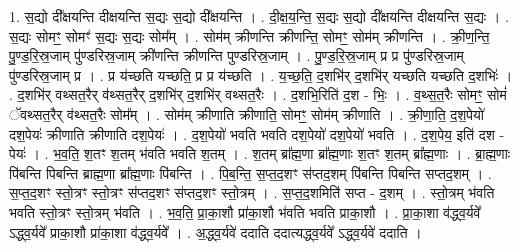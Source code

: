 \documentclass[17pt]{extarticle}
\begin{document}
1. स॒द्यो दी᳚क्षयन्ति दीक्षयन्ति स॒द्यः स॒द्यो दी᳚क्षयन्ति । . दी॒क्ष॒य॒न्ति॒ स॒द्यः स॒द्यो दी᳚क्षयन्ति दीक्षयन्ति स॒द्यः । . स॒द्यः सोमꣳ॒॒ सोमꣳ॑ स॒द्यः स॒द्यः सोम᳚म् । . सोम॑म् क्रीणन्ति क्रीणन्ति॒ सोमꣳ॒॒ सोम॑म् क्रीणन्ति । . क्री॒ण॒न्ति॒ पु॒ण्ड॒रि॒स्र॒जाम् पु॑ण्डरिस्र॒जाम् क्री॑णन्ति क्रीणन्ति पुण्डरिस्र॒जाम् । . पु॒ण्ड॒रि॒स्र॒जाम् प्र प्र पु॑ण्डरिस्र॒जाम् पु॑ण्डरिस्र॒जाम् प्र । . प्र य॑च्छति यच्छति॒ प्र प्र य॑च्छति । . य॒च्छ॒ति॒ द॒शभि॑र् द॒शभि॑र् यच्छति यच्छति द॒शभिः॑ । . द॒शभि॑र् वथ्सत॒रैर् व॑थ्सत॒रैर् द॒शभि॑र् द॒शभि॑र् वथ्सत॒रैः । . द॒शभि॒रिति॑ द॒श - भिः॒ । . व॒थ्स॒त॒रैः सोमꣳ॒॒ सोमं॑ ॅवथ्सत॒रैर् व॑थ्सत॒रैः सोम᳚म् । . सोम॑म् क्रीणाति क्रीणाति॒ सोमꣳ॒॒ सोम॑म् क्रीणाति । . क्री॒णा॒ति॒ द॒श॒पेयो॑ दश॒पेयः॑ क्रीणाति क्रीणाति दश॒पेयः॑ । . द॒श॒पेयो॑ भवति भवति दश॒पेयो॑ दश॒पेयो॑ भवति । . द॒श॒पेय॒ इति॑ दश - पेयः॑ । . भ॒व॒ति॒ श॒तꣳ श॒तम् भ॑वति भवति श॒तम् । . श॒तम् ब्रा᳚ह्म॒णा ब्रा᳚ह्म॒णाः श॒तꣳ श॒तम् ब्रा᳚ह्म॒णाः । . ब्रा॒ह्म॒णाः पि॑बन्ति पिबन्ति ब्राह्म॒णा ब्रा᳚ह्म॒णाः पि॑बन्ति । . पि॒ब॒न्ति॒ स॒प्त॒द॒शꣳ स॑प्तद॒शम् पि॑बन्ति पिबन्ति सप्तद॒शम् । . स॒प्त॒द॒शꣳ स्तो॒त्रꣳ स्तो॒त्रꣳ स॑प्तद॒शꣳ स॑प्तद॒शꣳ स्तो॒त्रम् । . स॒प्त॒द॒शमिति॑ सप्त - द॒शम् । . स्तो॒त्रम् भ॑वति भवति स्तो॒त्रꣳ स्तो॒त्रम् भ॑वति । . भ॒व॒ति॒ प्रा॒का॒शौ प्रा॑का॒शौ भ॑वति भवति प्राका॒शौ । . प्रा॒का॒शा व॑द्ध्व॒र्यवे᳚ ऽद्ध्व॒र्यवे᳚ प्राका॒शौ प्रा॑का॒शा व॑द्ध्व॒र्यवे᳚ । . अ॒द्ध्व॒र्यवे॑ ददाति ददात्यद्ध्व॒र्यवे᳚ ऽद्ध्व॒र्यवे॑ ददाति । \newline
\end{document}

